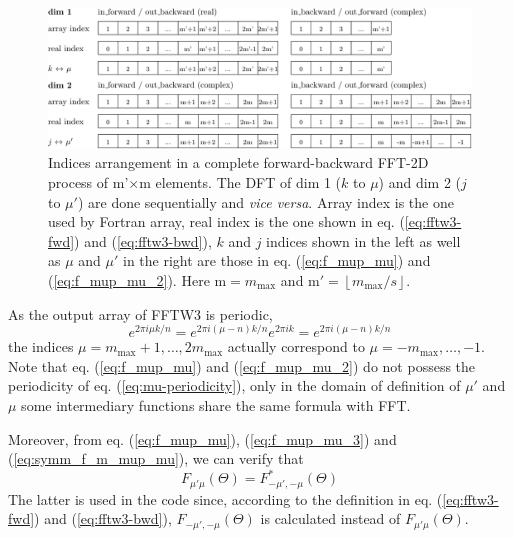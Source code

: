 \begin{figure}[h]
\centering{}%
\noindent\begin{minipage}[t]{1\textwidth}%
\begin{center}
\includegraphics[width=1\textwidth]{_figure/fftw3_indices}
\par\end{center}
\begin{center}
\caption[Indices arrangement in a complete forward-backward FFT-2D process
of m'$\times$m elements]{Indices arrangement in a complete forward-backward FFT-2D process
of m'$\times$m elements. The DFT of dim 1 ($k$ to $\mu$) and dim
2 ($j$ to $\mu'$) are done sequentially and \emph{vice versa}. Array
index is the one used by Fortran array, real index is the one shown
in eq. (\ref{eq:fftw3-fwd}) and (\ref{eq:fftw3-bwd}), $k$ and $j$
indices shown in the left as well as $\mu$ and $\mu'$ in the right
are those in eq. (\ref{eq:f_mup_mu}) and (\ref{eq:f_mup_mu_2}).
Here $\mathrm{m}=m_{\mathrm{max}}$ and $\mathrm{m}'=\left\lfloor m_{\mathrm{max}}/s\right\rfloor $.
\label{fig:FFTW3-2D-indices}}
\par\end{center}%
\end{minipage}
\end{figure}

As the output array of FFTW3 is periodic,
\begin{equation}
e^{2\pi i\mu k/n}=e^{2\pi i(\mu-n)k/n}e^{2\pi ik}=e^{2\pi i(\mu-n)k/n}\label{eq:mu-periodicity}
\end{equation}
the indices $\mu=m_{\mathrm{max}}+1,\ldots,2m_{\mathrm{max}}$ actually
correspond to $\mu=-m_{\mathrm{max}},\ldots,-1$. Note that eq. (\ref{eq:f_mup_mu})
and (\ref{eq:f_mup_mu_2}) do not possess the periodicity of eq. (\ref{eq:mu-periodicity}),
only in the domain of definition of $\mu'$ and $\mu$ some intermediary
functions share the same formula with \acs{FFT}.

Moreover, from eq. (\ref{eq:f_mup_mu}), (\ref{eq:f_mup_mu_3}) and
(\ref{eq:symm_f_m_mup_mu}), we can verify that
\begin{equation}
F_{\mu'\mu}(\Theta)=F_{-\mu',-\mu}^{*}(\Theta)
\end{equation}
The latter is used in the code since, according to the definition
in eq. (\ref{eq:fftw3-fwd}) and (\ref{eq:fftw3-bwd}), $F_{-\mu',-\mu}(\Theta)$
is calculated instead of $F_{\mu'\mu}(\Theta)$.

